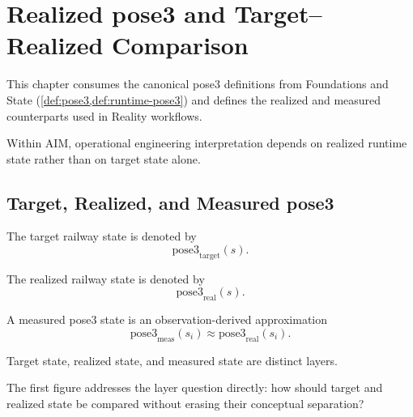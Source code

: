 
\chapter{Realized pose3 and Target--Realized Comparison}

\label{chap:realized-pose3}

This chapter consumes the canonical pose3 definitions from Foundations
and State (\cref{def:pose3,def:runtime-pose3}) and defines the realized
and measured counterparts used in Reality workflows.

\begin{principle}
\label{princ:realized-state-principle}
Within AIM, operational engineering interpretation depends on realized
runtime state rather than on target state alone.
\end{principle}

\section{Target, Realized, and Measured pose3}

\begin{definition}
\label{def:target-pose3}
The target railway state is denoted by
\[
\mathrm{pose3}_{\mathrm{target}}(s).
\]
\end{definition}

\begin{definition}
\label{def:realized-pose3}
The realized railway state is denoted by
\[
\mathrm{pose3}_{\mathrm{real}}(s).
\]
\end{definition}

\begin{definition}
\label{def:measured-pose3}
A measured pose3 state is an observation-derived approximation
\[
\mathrm{pose3}_{\mathrm{meas}}(s_i)
\approx
\mathrm{pose3}_{\mathrm{real}}(s_i).
\]
\end{definition}

\begin{principle}
\label{princ:measurement-separation}
Target state, realized state, and measured state are distinct layers.
\end{principle}

The first figure addresses the layer question directly: how should
target and realized state be compared without erasing their conceptual
separation?

